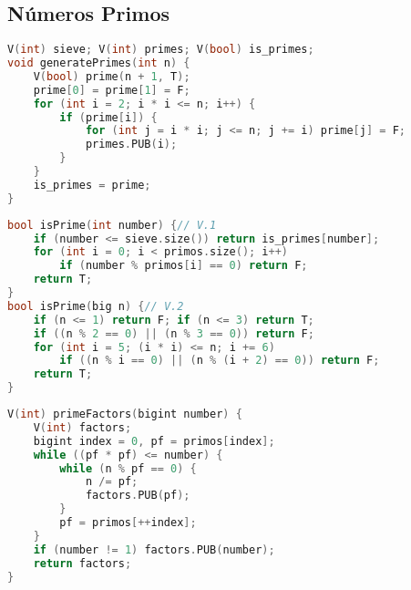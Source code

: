 \subsection{Números Primos}
\begin{lstlisting}[language = C++, title=Crivo de Eratóstenes]
V(int) sieve; V(int) primes; V(bool) is_primes;
void generatePrimes(int n) {
    V(bool) prime(n + 1, T);
    prime[0] = prime[1] = F;
    for (int i = 2; i * i <= n; i++) {
        if (prime[i]) {
            for (int j = i * i; j <= n; j += i) prime[j] = F;
            primes.PUB(i);
        }
    }
    is_primes = prime;
}
\end{lstlisting}

\newpage

\begin{lstlisting}[language = C++,title=Teste de Primalidade (Determinístico)]
bool isPrime(int number) {// V.1
    if (number <= sieve.size()) return is_primes[number];
    for (int i = 0; i < primos.size(); i++)
        if (number % primos[i] == 0) return F;
    return T;
}
bool isPrime(big n) {// V.2
	if (n <= 1) return F; if (n <= 3) return T;
    if ((n % 2 == 0) || (n % 3 == 0)) return F;
    for (int i = 5; (i * i) <= n; i += 6)
        if ((n % i == 0) || (n % (i + 2) == 0)) return F;
    return T;
}
\end{lstlisting}

\newpage

\begin{lstlisting}[language=C++, title={Fatores Primos}]
V(int) primeFactors(bigint number) {
    V(int) factors;
    bigint index = 0, pf = primos[index];
    while ((pf * pf) <= number) {
        while (n % pf == 0) {
            n /= pf;
            factors.PUB(pf);
        }
        pf = primos[++index];
    }
    if (number != 1) factors.PUB(number);
    return factors;
}
\end{lstlisting}

\newpage

